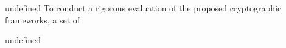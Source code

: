 undefined
To conduct a rigorous evaluation of the proposed cryptographic frameworks, a set of 

undefined